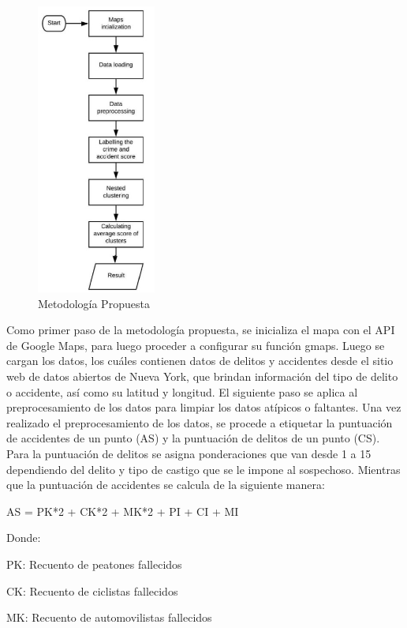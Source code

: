 \begin{figure}[h]
	\begin{center}
		\includegraphics[width=0.35\textwidth]{2/figures/routeMet.jpg}
		\caption{Metodología Propuesta}
		\label{1:fig2}
	\end{center}
\end{figure}
Como primer paso de la metodología propuesta, se inicializa el mapa con el API de Google Maps, para luego proceder a configurar su función gmaps. Luego se cargan los datos, los cuáles contienen datos de delitos y accidentes desde el sitio web de datos abiertos de Nueva York, que brindan información del tipo de delito o accidente, así como su latitud y longitud. El siguiente paso se aplica al preprocesamiento de los datos para limpiar los datos atípicos o faltantes.
Una vez realizado el preprocesamiento de los datos, se procede a etiquetar la puntuación de accidentes de un punto (AS) y la puntuación de delitos de un punto (CS). Para la puntuación de delitos se asigna ponderaciones que van desde 1 a 15 dependiendo del delito y tipo de castigo que se le impone al sospechoso. Mientras que la puntuación de accidentes se calcula de la siguiente manera:

AS = PK*2 + CK*2 + MK*2 + PI + CI + MI

	Donde:

PK: Recuento de peatones fallecidos

CK: Recuento de ciclistas fallecidos

MK: Recuento de automovilistas fallecidos

